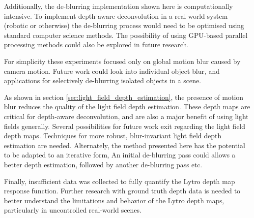 Additionally, the de-blurring implementation shown here is computationally intensive.
To implement depth-aware deconvolution in a real world system (robotic or otherwise) the de-blurring process would need to be optimised using standard computer science methods.
The possibility of using GPU-based parallel processing methods could also be explored in future research.

For simplicity these experiments focused only on global motion blur caused by camera motion.
Future work could look into individual object blur, and applications for selectively de-blurring isolated objects in a scene.

As shown in section \ref{sec:light_field_depth_estimation}, the presence of motion blur reduces the quality of the light field depth estimation.
These depth maps are critical for depth-aware deconvolution, and are also a major benefit of using light fields generally.
Several possibilities for future work exit regarding the light field depth maps.
Techniques for more robust, blur-invariant light field depth estimation are needed.
Alternately, the method presented here has the potential to be adapted to an iterative form,
An initial de-blurring pass could allows a better depth estimation, followed by another de-blurring pass etc.

Finally, insufficient data was collected to fully quantify the Lytro depth map response function.
Further research with ground truth depth data is needed to better understand the limitations and behavior of the Lytro depth maps, particularly in uncontrolled real-world scenes.

